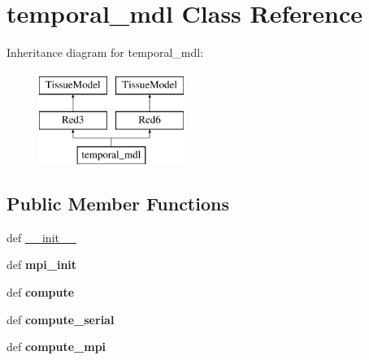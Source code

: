 \hypertarget{classcell__mdl2_1_1temporal__mdl}{
\section{temporal\_\-mdl Class Reference}
\label{classcell__mdl2_1_1temporal__mdl}
}
Inheritance diagram for temporal\_\-mdl:\begin{figure}[H]
\begin{center}
\leavevmode
\includegraphics[height=3cm]{classcell__mdl2_1_1temporal__mdl}
\end{center}
\end{figure}
\subsection*{Public Member Functions}
\begin{DoxyCompactItemize}
\item 
def \hyperlink{classcell__mdl2_1_1temporal__mdl_ac775ee34451fdfa742b318538164070e}{\_\-\_\-init\_\-\_\-}
\item 
\hypertarget{classcell__mdl2_1_1temporal__mdl_a3c01ac779ed7c6ee47a946f2700e0d2b}{
def {\bfseries mpi\_\-init}}
\label{classcell__mdl2_1_1temporal__mdl_a3c01ac779ed7c6ee47a946f2700e0d2b}

\item 
\hypertarget{classcell__mdl2_1_1temporal__mdl_aaa2084b96999fb1734fd2f330bfa01a6}{
def {\bfseries compute}}
\label{classcell__mdl2_1_1temporal__mdl_aaa2084b96999fb1734fd2f330bfa01a6}

\item 
\hypertarget{classcell__mdl2_1_1temporal__mdl_a4de97979f16443e44dc6fe1a29277a5a}{
def {\bfseries compute\_\-serial}}
\label{classcell__mdl2_1_1temporal__mdl_a4de97979f16443e44dc6fe1a29277a5a}

\item 
\hypertarget{classcell__mdl2_1_1temporal__mdl_a19b3497e1e4a715d2c73e9b85cb75d0d}{
def {\bfseries compute\_\-mpi}}
\label{classcell__mdl2_1_1temporal__mdl_a19b3497e1e4a715d2c73e9b85cb75d0d}

\end{DoxyCompactItemize}
